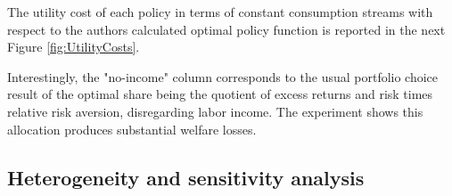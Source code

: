 \documentclass[./CGMPortfolio.tex]{subfiles}
\begin{document}
\providecommand{\figName}{Allocation-Rules} %
\providecommand{\figFile}{Alloc_rules} %
\hypertarget{\figFile}{}
\hypertarget{\figName}{}

The utility cost of each policy in terms of constant consumption streams with respect to the authors calculated optimal policy function is reported in the next Figure \ref{fig:UtilityCosts}.

\providecommand{\figName}{Utility-Costs} %
\providecommand{\figFile}{Util_cost} %
\hypertarget{\figFile}{}
\hypertarget{\figName}{}

Interestingly, the "no-income" column corresponds to the usual portfolio choice result of the optimal share being the quotient of excess returns and risk times relative risk aversion, disregarding labor income. The experiment shows this allocation produces substantial welfare losses.

\subsection{Heterogeneity and sensitivity analysis}
\end{document}
